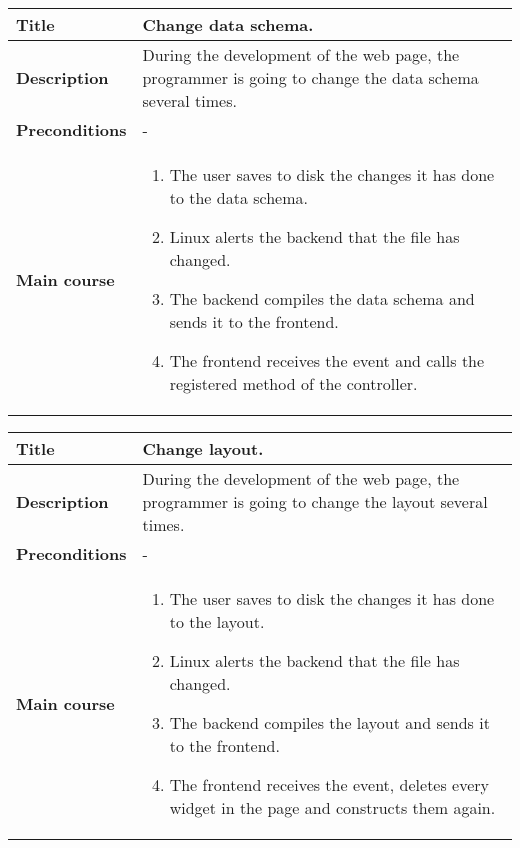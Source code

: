 \documentclass[12pt]{article}
\begin{document}
            \begin{tabularx}{\textwidth}{|l|X|}
                \hline
                \textbf{Title} & Change data schema.\\
                \hline
                \textbf{Description} & During the development of the web page,
                the programmer is going to change the data schema several times.\\
                \hline
                \textbf{Preconditions} & - \\
                \hline
                \textbf{Main course} &
                    \begin{enumerate}
                        \item The user saves to disk the changes it has done to
                              the data schema.
                        \item Linux alerts the backend that the file has
                              changed.
                        \item The backend compiles the data schema and sends it
                              to the frontend.
                        \item The frontend receives the event and calls the
                              registered method of the controller.
                    \end{enumerate}\\
                \hline
            \end{tabularx}

            \begin{tabularx}{\textwidth}{|l|X|}
                \hline
                \textbf{Title} & Change layout.\\
                \hline
                \textbf{Description} & During the development of the web page,
                the programmer is going to change the layout several times.\\
                \hline
                \textbf{Preconditions} & - \\
                \hline
                \textbf{Main course} &
                    \begin{enumerate}
                        \item The user saves to disk the changes it has done to
                              the layout.
                        \item Linux alerts the backend that the file has
                              changed.
                        \item The backend compiles the layout and sends it to
                              the frontend.
                        \item The frontend receives the event, deletes every
                              widget in the page and constructs them again.
                    \end{enumerate}\\
                \hline
            \end{tabularx}
            \setlength{\parindent}{1cm}
\end{document}
